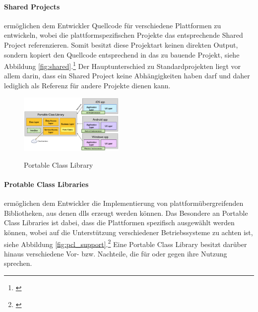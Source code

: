 \paragraph{Shared Projects}

ermöglichen dem Entwickler Quellcode für verschiedene Plattformen zu entwickeln, wobei die plattformspezifischen Projekte das entsprechende Shared Project referenzieren. Somit besitzt diese Projektart keinen direkten Output, sondern kopiert den Quellcode entsprechend in das zu bauende Projekt, siehe Abbildung \eqref{fig:shared}.\footnote{\citep[vgl.][Shared Projects - Xamarin]{Xamarin.SharedProjects}\label{note39}} Der Hauptunterschied zu Standardprojekten liegt vor allem darin, dass ein Shared Project keine Abhängigkeiten haben darf und daher lediglich als Referenz für andere Projekte dienen kann.

\begin{figure}
	\begin{center}
		\includegraphics[width=0.45\textwidth]{images/technische_grundlagen/PortableClassLibrary.png}
	\end{center}
	\caption{Portable Class Library}
	\cite{Xamarin.PortableClass}
	\label{fig:portable}
\end{figure}

\paragraph{Protable Class Libraries}

ermöglichen dem Entwickler die Implementierung von plattformübergreifenden Bibliotheken, aus denen \glspl{dll} erzeugt werden können. Das Besondere an Portable Class Libraries ist dabei, dass die Plattformen spezifisch ausgewählt werden können, wobei auf die Unterstützung verschiedener Betriebssysteme zu achten ist, siehe Abbildung \eqref{fig:pcl_support}.\footnote{\citep[vgl.][Introduction to Portable Class Libraries - Xamarin]{Xamarin.PortableClass}\label{note40}} Eine Portable Class Library besitzt darüber hinaus verschiedene Vor- bzw. Nachteile, die für oder gegen ihre Nutzung sprechen.\\


